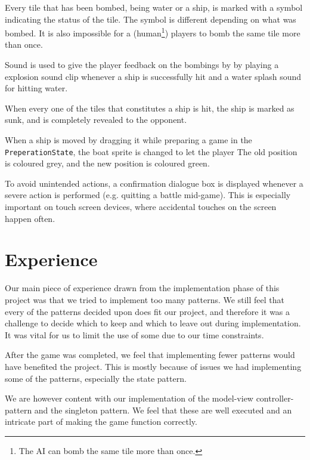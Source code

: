 Every tile that has been bombed, being water or a ship, is marked with a symbol indicating the status of the tile. The symbol is different depending on what was bombed. It is also impossible for a (human\footnote{The AI can bomb the same tile more than once.}) players to bomb the same tile more than once.

Sound is used to give the player feedback on the bombings by by playing a explosion sound clip whenever a ship is successfully hit and a water splash sound for hitting water.

When every one of the tiles that constitutes a ship is hit, the ship is marked as sunk, and is completely revealed to the opponent.

When a ship is moved by dragging it while preparing a game in the \texttt{PreperationState}, the boat sprite is changed to let the player
The old position is coloured grey, and the new position is coloured green.

To avoid unintended actions, a confirmation dialogue box is displayed whenever a severe action is performed (e.g. quitting a battle mid-game). This is especially important on touch screen devices, where accidental touches on the screen happen often.


\section{Experience} %
Our main piece of experience drawn from the implementation phase of this project was that we tried to implement too many patterns. We still feel that every of the patterns decided upon does fit our project, and therefore it was a challenge to decide which to keep and which to leave out during implementation. It was vital for us to limit the use of some due to our time constraints. %

After the game was completed, we feel that implementing fewer patterns would have benefited the project. This is mostly because of issues we had implementing some of the patterns, especially the state pattern.%

We are however content with our implementation of the model-view controller-pattern and the singleton pattern. We feel that these are well executed and an intricate part of making the game function correctly.

